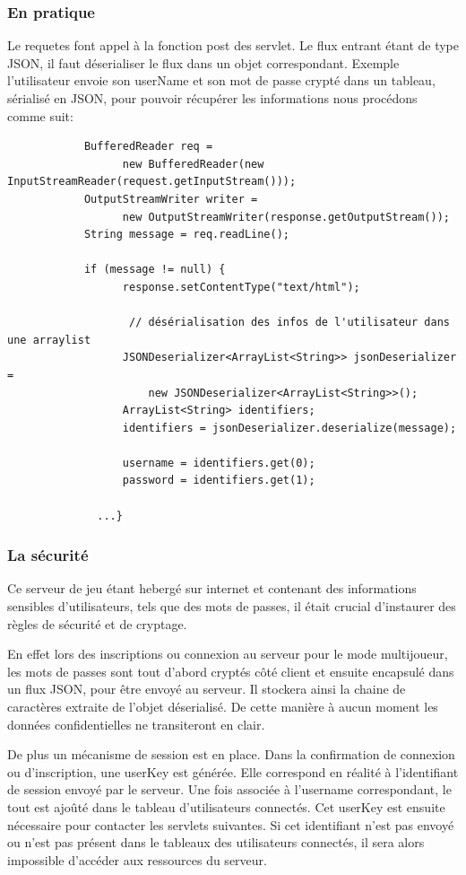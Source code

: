 \documentclass[]{report}
\begin{document}
		
		\subsubsection{En pratique}
		
		Le requetes font appel à la fonction post des servlet. Le flux entrant étant
		de type JSON, il faut déserialiser le flux dans un objet correspondant. Exemple
		l'utilisateur envoie son userName et son mot de passe crypté dans un tableau,
		sérialisé en JSON, pour pouvoir récupérer les informations nous procédons
		comme suit: 
		
		\begin{verbatim}
			BufferedReader req = 
				  new BufferedReader(new InputStreamReader(request.getInputStream()));
			OutputStreamWriter writer = 
				  new OutputStreamWriter(response.getOutputStream());
			String message = req.readLine();
			
			if (message != null) {
				  response.setContentType("text/html");
				
				   // désérialisation des infos de l'utilisateur dans une arraylist 
				  JSONDeserializer<ArrayList<String>> jsonDeserializer = 
					  new JSONDeserializer<ArrayList<String>>();
				  ArrayList<String> identifiers;
				  identifiers = jsonDeserializer.deserialize(message);
				
				  username = identifiers.get(0);
				  password = identifiers.get(1);
				  
			  ...}
		\end{verbatim}
		
		
		\subsubsection{La sécurité}
		Ce serveur de jeu étant hebergé sur internet et contenant des informations
		sensibles d'utilisateurs, tels que des mots de passes, il était crucial
		d'instaurer des règles de sécurité et de cryptage. 
		
		En effet lors des inscriptions ou connexion au serveur pour le mode
		multijoueur, les mots de passes sont tout d'abord cryptés côté client et
		ensuite encapsulé dans un flux JSON, pour être envoyé au serveur. Il stockera
		ainsi la chaine de caractères extraite de l'objet déserialisé. De cette
		manière à aucun moment les données confidentielles ne transiteront en clair.
		
		De plus un mécanisme de session est en place. Dans la confirmation de
		connexion ou d'inscription, une userKey est générée. Elle correspond en
		réalité à l'identifiant de session envoyé par le serveur. Une fois associée
		à l'username correspondant, le tout est ajoûté dans le tableau d'utilisateurs
		connectés.
		Cet userKey est ensuite nécessaire pour contacter les servlets suivantes. Si
		cet identifiant n'est pas envoyé ou n'est pas présent dans le tableaux des
		utilisateurs connectés, il sera alors impossible d'accéder aux ressources du
		serveur.
		
\end{document}
